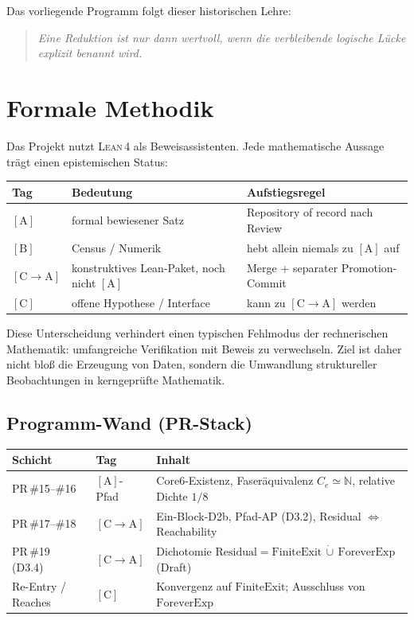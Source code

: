 \documentclass[11pt,a4paper]{article}
\theoremstyle{definition}
\theoremstyle{remark}
\newcommand{\Lean}{\textsc{Lean}\,4}
\newcommand{\CA}{\ensuremath{[\mathrm{C}\!\to\!\mathrm{A}]}}
\newcommand{\tagA}{\ensuremath{[\mathrm{A}]}}
\newcommand{\tagB}{\ensuremath{[\mathrm{B}]}}
\newcommand{\tagC}{\ensuremath{[\mathrm{C}]}}
\newcommand{\Residual}{\mathrm{Residual}}
\newcommand{\FiniteExit}{\mathrm{FiniteExit}}
\newcommand{\Forever}{\mathrm{ForeverExp}}
\newcommand{\N}{\mathbb{N}}
\begin{document}
Das vorliegende Programm folgt dieser historischen Lehre:
\begin{quote}
\emph{Eine Reduktion ist nur dann wertvoll, wenn die verbleibende logische
Lücke explizit benannt wird.}
\end{quote}

\section{Formale Methodik}

Das Projekt nutzt \Lean{} als Beweisassistenten. Jede mathematische Aussage
trägt einen epistemischen Status:

\begin{center}
\begin{tabular}{@{}llp{7.2cm}@{}}
\toprule
Tag & Bedeutung & Aufstiegsregel \\
\midrule
\tagA & formal bewiesener Satz & Repository of record nach Review \\
\tagB & Census / Numerik & hebt allein niemals zu \tagA{} auf \\
\CA & konstruktives Lean-Paket, noch nicht \tagA & Merge + separater Promotion-Commit \\
\tagC & offene Hypothese / Interface & kann zu \CA{} werden \\
\bottomrule
\end{tabular}
\end{center}

Diese Unterscheidung verhindert einen typischen Fehlmodus der
rechnerischen Mathematik: umfangreiche Verifikation mit Beweis zu
verwechseln. Ziel ist daher nicht bloß die Erzeugung von Daten, sondern die
Umwandlung struktureller Beobachtungen in kerngeprüfte Mathematik.

\subsection{Programm-Wand (PR-Stack)}

\begin{center}
\small
\begin{tabular}{@{}p{2.8cm}p{1.6cm}p{7.4cm}@{}}
\toprule
Schicht & Tag & Inhalt \\
\midrule
PR\,\#15--\#16
  & \tagA-Pfad
  & Core6-Existenz, Faseräquivalenz $C_e\simeq\N$, relative Dichte $1/8$ \\
PR\,\#17--\#18
  & \CA
  & Ein-Block-D2b, Pfad-AP (D3.2), Residual $\Leftrightarrow$ Reachability \\
PR\,\#19 (D3.4)
  & \CA
  & Dichotomie $\Residual=\FiniteExit\,\dot\cup\,\Forever$ (Draft) \\
Re-Entry / Reaches
  & \tagC
  & Konvergenz auf $\FiniteExit$; Ausschluss von $\Forever$ \\
\bottomrule
\end{tabular}
\end{center}
\end{document}
